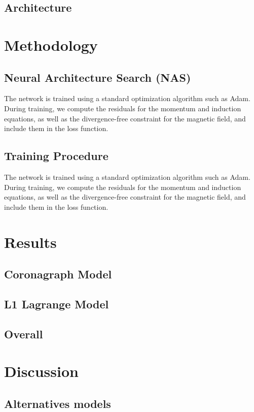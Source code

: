 \documentclass[12pt]{article}
\begin{document}
\subsection{Architecture}

\section{Methodology}

\subsection{Neural Architecture Search (NAS)}
The network is trained using a standard optimization algorithm such as Adam. During training, we compute the residuals for the momentum and induction equations, as well as the divergence-free constraint for the magnetic field, and include them in the loss function.

\subsection{Training Procedure}
The network is trained using a standard optimization algorithm such as Adam. During training, we compute the residuals for the momentum and induction equations, as well as the divergence-free constraint for the magnetic field, and include them in the loss function.

\section{Results}

\subsection{Coronagraph Model}

\subsection{L1 Lagrange Model}

\subsection{Overall}

\section{Discussion}

\subsection{Alternatives models}
\end{document}
